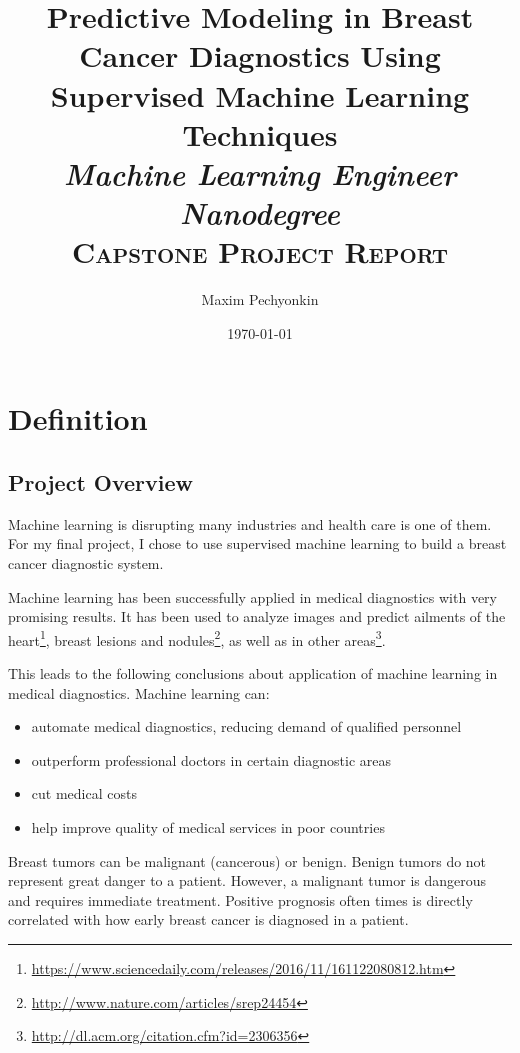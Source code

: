 \documentclass[10pt, a4paper]{article}
\begin{document}
\title{Predictive Modeling in Breast Cancer Diagnostics Using Supervised Machine Learning Techniques\\
	\Large \textit{Machine Learning Engineer Nanodegree}\\
	\large \textsc{Capstone Project Report}
	}

\author{Maxim Pechyonkin
	}
\date{\small \today}

\maketitle

\section{Definition}

\subsection{Project Overview}

Machine learning is disrupting many industries and health care is one of them. For my final project, I chose to use supervised machine learning to build a breast cancer diagnostic system.

Machine learning has been successfully applied in medical diagnostics with very promising results. It has been used to analyze images and predict ailments of the heart\footnote{\scriptsize \url{https://www.sciencedaily.com/releases/2016/11/161122080812.htm}}, breast lesions and nodules\footnote{\scriptsize \url{http://www.nature.com/articles/srep24454}}, as well as in other areas\footnote{\scriptsize \url{http://dl.acm.org/citation.cfm?id=2306356}}. 

This leads to the following conclusions about application of machine learning in medical diagnostics. Machine learning can:

\begin{itemize}
	\item automate medical diagnostics, reducing demand of qualified personnel
	\item outperform professional doctors in certain diagnostic areas
	\item cut medical costs
	\item help improve quality of medical services in poor countries
\end{itemize}



Breast tumors can be malignant (cancerous) or benign. Benign tumors do not represent great danger to a patient. However, a malignant tumor is dangerous and requires immediate treatment. Positive prognosis often times is directly correlated with how early breast cancer is diagnosed in a patient.
\end{document}

